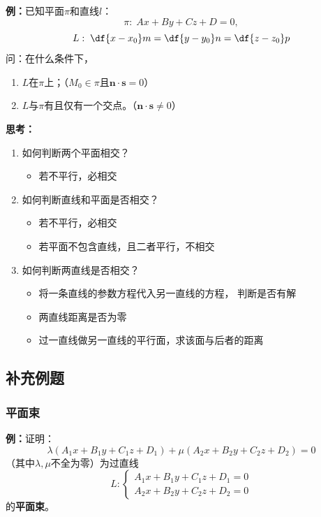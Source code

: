 
{\bf 例：}已知平面$\pi$和直线$l$：
$$\pi:\;Ax+By+Cz+D=0,$$
$$L:\;\df{x-x_0}m=\df{y-y_0}n=\df{z-z_0}p$$
问：在什么条件下，
\begin{enumerate}[(1)]
  \setlength{\itemindent}{1cm}
  \item $L$在$\pi$上；\hfill（$M_0\in\pi$且$\bm{n}\cdot\bm{s}=0$）
  \item $L$与$\pi$有且仅有一个交点。\hfill（$\bm{n}\cdot\bm{s}\ne0$）
\end{enumerate}

{\bf 思考：}
\begin{enumerate}[(1)]
  \setlength{\itemindent}{1cm}
  \item 如何判断两个平面相交？
  \begin{itemize}
    \item 若不平行，必相交
  \end{itemize}
  \item 如何判断直线和平面是否相交？
  \begin{itemize}
    \item 若不平行，必相交
    \item 若平面不包含直线，且二者平行，不相交
  \end{itemize}
  \item 如何判断两直线是否相交？
  \begin{itemize}
    \item 将一条直线的参数方程代入另一直线的方程，
    判断是否有解
    \item 两直线距离是否为零
    \item 过一直线做另一直线的平行面，求该面与后者的距离
  \end{itemize}
\end{enumerate}

\subsection{补充例题}

\subsubsection{平面束}

{\bf 例：}证明：$$\lambda(A_1x+B_1y+C_1z+D_1)+\mu(A_2x+B_2y+C_2z+D_2)=0$$
（其中$\lambda,\mu$不全为零）为过直线
$$L:\left\{\begin{array}{l}
	A_1x+B_1y+C_1z+D_1=0\\
	A_2x+B_2y+C_2z+D_2=0
\end{array}\right.$$
的{\bf 平面束}。

